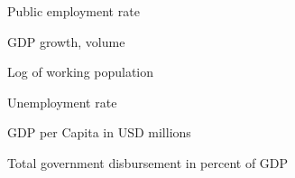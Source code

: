 \documentclass[a4paper, 10pt]{article}
\newcommand{\insertplot}[2]{
  \begin{figure}[!ht]
    \centering
    
    \caption{#2}
  \end{figure}
}
\begin{document}
%     
\begin{landscape}
  \insertplot{simple_model_quarterly_egr.tex}{Public employment rate}
  \insertplot{simple_model_quarterly_gdpv_annpct.tex}{GDP growth, volume}
  \insertplot{simple_model_quarterly_lpop_interpolated.tex}{Log of working population}
  \insertplot{simple_model_quarterly_unr.tex}{Unemployment rate}
  \insertplot{simple_model_quarterly_gdp_per_capita_interpolated.tex}{GDP per
    Capita in USD millions}
  \insertplot{simple_model_quarterly_ypgtq_interpolated.tex}{Total government disbursement in
    percent of GDP}
\end{landscape}
\end{document}
